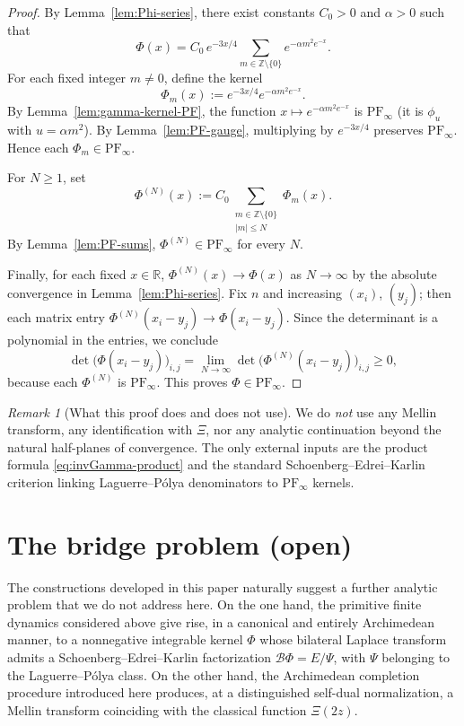 \documentclass[12pt]{amsart}
\theoremstyle{definition}
\theoremstyle{remark}
\newtheorem{remark}[theorem]{Remark}
\begin{document}
\begin{proof}
By Lemma~\ref{lem:Phi-series}, there exist constants $C_0>0$ and $\alpha>0$ such that
\[
\Phi(x)=C_0\,e^{-3x/4}\sum_{m\in\mathbb Z\setminus\{0\}} e^{-\alpha m^2 e^{-x}}.
\]
For each fixed integer $m\neq0$, define the kernel
\[
\Phi_m(x):=e^{-3x/4}e^{-\alpha m^2 e^{-x}}.
\]
By Lemma~\ref{lem:gamma-kernel-PF}, the function $x\mapsto e^{-\alpha m^2 e^{-x}}$ is
$\mathrm{PF}_\infty$ (it is $\phi_u$ with $u=\alpha m^2$). By Lemma~\ref{lem:PF-gauge},
multiplying by $e^{-3x/4}$ preserves $\mathrm{PF}_\infty$. Hence each $\Phi_m\in\mathrm{PF}_\infty$.

For $N\ge1$, set
\[
\Phi^{(N)}(x):=C_0\sum_{\substack{m\in\mathbb Z\setminus\{0\}\\ |m|\le N}}\Phi_m(x).
\]
By Lemma~\ref{lem:PF-sums}, $\Phi^{(N)}\in\mathrm{PF}_\infty$ for every $N$.

Finally, for each fixed $x\in\mathbb R$, $\Phi^{(N)}(x)\to\Phi(x)$ as $N\to\infty$
by the absolute convergence in Lemma~\ref{lem:Phi-series}. Fix $n$ and increasing
$(x_i)$, $(y_j)$; then each matrix entry $\Phi^{(N)}(x_i-y_j)\to\Phi(x_i-y_j)$.
Since the determinant is a polynomial in the entries, we conclude
\[
\det\big(\Phi(x_i-y_j)\big)_{i,j}
=
\lim_{N\to\infty}
\det\big(\Phi^{(N)}(x_i-y_j)\big)_{i,j}
\ge 0,
\]
because each $\Phi^{(N)}$ is $\mathrm{PF}_\infty$. This proves $\Phi\in\mathrm{PF}_\infty$.
\end{proof}

\begin{remark}[What this proof does and does not use]
We do \emph{not} use any Mellin transform, any identification with $\Xi$, nor any
analytic continuation beyond the natural half-planes of convergence. The only external
inputs are the product formula \eqref{eq:invGamma-product} and the standard
Schoenberg--Edrei--Karlin criterion linking Laguerre--P\'olya denominators to
$\mathrm{PF}_\infty$ kernels.
\end{remark}

\section{The bridge problem (open)}
\label{sec:future-directions}

The constructions developed in this paper naturally suggest a further analytic
problem that we do not address here. On the one hand, the primitive finite dynamics
considered above give rise, in a canonical and entirely Archimedean manner, to a
nonnegative integrable kernel $\Phi$ whose bilateral Laplace transform admits a
Schoenberg--Edrei--Karlin factorization $\mathcal B\Phi=E/\Psi$, with $\Psi$ belonging
to the Laguerre--P\'olya class\cite{Levin1964,PolyaSchur1914}. On the other hand, the Archimedean completion procedure
introduced here produces, at a distinguished self-dual normalization, a Mellin
transform coinciding with the classical function $\Xi(2z)$.
\end{document}
